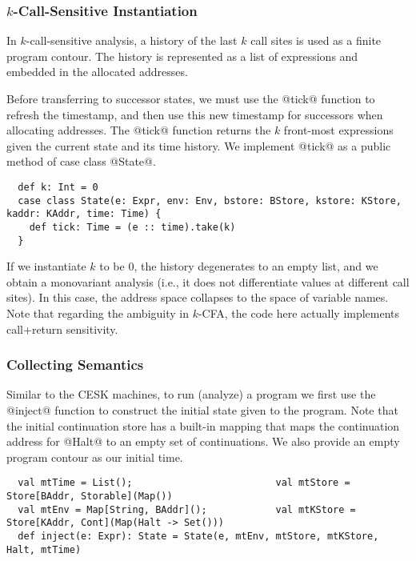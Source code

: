 \documentclass[acmsmall, review]{acmart}\settopmatter{}
\begin{document}
\subsubsection{$k$-Call-Sensitive Instantiation} \label{kcfainst}

In $k$-call-sensitive analysis, a history of the last $k$ call sites is used as a 
finite program contour. The history is represented as a list of expressions and embedded
in the allocated addresses.

Before transferring to successor states, we must use the @tick@ function to refresh the 
timestamp, and then use this new timestamp for successors when allocating addresses.
The @tick@ function returns the $k$ front-most expressions given the current state and its
time history. We implement @tick@ as a public method of case class @State@.

\begin{lstlisting}
  def k: Int = 0
  case class State(e: Expr, env: Env, bstore: BStore, kstore: KStore, kaddr: KAddr, time: Time) {
    def tick: Time = (e :: time).take(k)
  }
\end{lstlisting}

If we instantiate $k$ to be $0$, the history degenerates to an empty list, and we obtain
a monovariant analysis (i.e., it does not differentiate values at different call sites).
In this case, the address space collapses to the space of variable names.
Note that regarding the ambiguity in $k$-CFA\cite{Gilray:2016:ACP:2951913.2951936},
the code here actually implements call+return sensitivity.

\subsubsection{Collecting Semantics}

Similar to the CESK machines, to run (analyze) a program we first use the @inject@ function
to construct the initial state given to the program. Note that the initial continuation store
has a built-in mapping that maps the continuation address for @Halt@ to an empty set of 
continuations. We also provide an empty program contour as our initial time.

\begin{lstlisting}
  val mtTime = List();                         val mtStore = Store[BAddr, Storable](Map())
  val mtEnv = Map[String, BAddr]();            val mtKStore = Store[KAddr, Cont](Map(Halt -> Set()))
  def inject(e: Expr): State = State(e, mtEnv, mtStore, mtKStore, Halt, mtTime)
\end{lstlisting}
\end{document}

